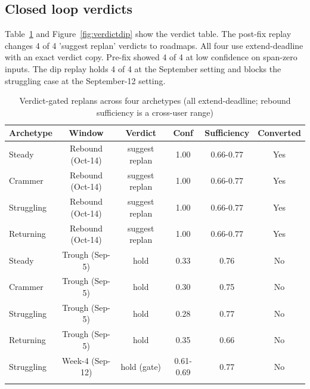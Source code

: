 \documentclass[sn-mathphys,Numbered]{sn-jnl}%
\theoremstyle{thmstyleone}%
\theoremstyle{thmstyletwo}%
\theoremstyle{thmstylethree}%
\begin{document}
\subsection{Closed loop verdicts}\label{subsec44}

Table~\ref{tab:verdict} and Figure~\ref{fig:verdictdip} show the verdict table. The post-fix replay changes 4 of 4 'suggest replan' verdicts to roadmaps. All four use extend-deadline with an exact verdict copy. Pre-fix showed 4 of 4 at low confidence on span-zero inputs. The dip replay holds 4 of 4 at the September setting and blocks the struggling case at the September-12 setting.

\begin{table}[htbp]
\caption{Verdict-gated replans across four archetypes (all extend-deadline; rebound sufficiency is a cross-user range)}\label{tab:verdict}%
\begin{tabular*}{\textwidth}{@{\extracolsep\fill}lccccc@{}}
\toprule
Archetype & Window & Verdict & Conf & Sufficiency & Converted \\
\midrule
Steady & Rebound (Oct-14) & suggest replan & 1.00 & 0.66-0.77 & Yes \\
Crammer & Rebound (Oct-14) & suggest replan & 1.00 & 0.66-0.77 & Yes \\
Struggling & Rebound (Oct-14) & suggest replan & 1.00 & 0.66-0.77 & Yes \\
Returning & Rebound (Oct-14) & suggest replan & 1.00 & 0.66-0.77 & Yes \\
Steady & Trough (Sep-5) & hold & 0.33 & 0.76 & No \\
Crammer & Trough (Sep-5) & hold & 0.30 & 0.75 & No \\
Struggling & Trough (Sep-5) & hold & 0.28 & 0.77 & No \\
Returning & Trough (Sep-5) & hold & 0.35 & 0.66 & No \\
Struggling & Week-4 (Sep-12) & hold (gate) & 0.61-0.69 & 0.77 & No \\
\botrule
\end{tabular*}
\end{table}
\end{document}
